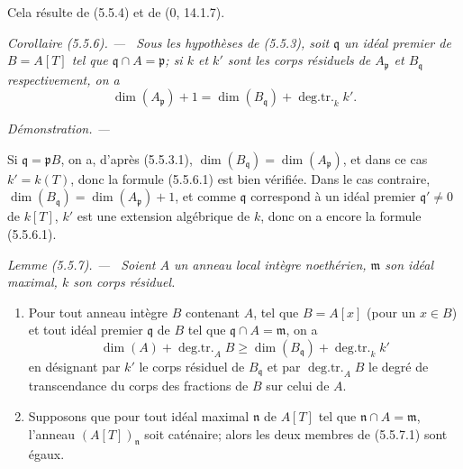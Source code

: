 \documentclass[10pt,oneside]{book}
\newcommand{\oldpage}[2][]{%
  \setcounter{footnote}{0}%
  \marginpar{\scriptsize\textbf{#1}~|~#2}\ignorespaces}
\newenvironment{corollary}[1][]{%
  \par\medskip\noindent\itshape Corollaire (#1). ---\ }{\par}
\newenvironment{lemma}[1][]{%
  \par\medskip\noindent\itshape Lemme (#1). ---\ }{\par}
\newenvironment{proof}{%
  \par\medskip\noindent\textit{Démonstration. ---\ }}{\par}
\begin{document}
Cela résulte de (5.5.4) et de (0, 14.1.7).

\begin{corollary}[5.5.6]
\label{IV.2.s5.5.6-fr}
Sous les hypothèses de (5.5.3), soit $\mathfrak q$ un idéal premier de
$B=A[T]$ tel que $\mathfrak q\cap A=\mathfrak p$; si $k$ et $k'$ sont les
corps résiduels de $A_{\mathfrak p}$ et $B_{\mathfrak q}$ respectivement,
on a
\begin{equation}
\dim(A_{\mathfrak p})+1
=\dim(B_{\mathfrak q})+\operatorname{deg.tr.}_k k'.
\tag{5.5.6.1}\label{IV.2.s5.5.6.1-fr}
\end{equation}
\end{corollary}

\begin{proof}
\oldpage[IV-2]{96}

Si $\mathfrak q=\mathfrak pB$, on a, d'après (5.5.3.1),
$\dim(B_{\mathfrak q})=\dim(A_{\mathfrak p})$, et dans ce cas $k'=k(T)$,
donc la formule (5.5.6.1) est bien vérifiée. Dans le cas contraire,
$\dim(B_{\mathfrak q})=\dim(A_{\mathfrak p})+1$, et comme $\mathfrak q$
correspond à un idéal premier $\mathfrak q'\ne0$ de $k[T]$, $k'$ est une
extension algébrique de $k$, donc on a encore la formule (5.5.6.1).
\end{proof}

\begin{lemma}[5.5.7]
\label{IV.2.s5.5.7-fr}
Soient $A$ un anneau local intègre noethérien, $\mathfrak m$ son idéal
maximal, $k$ son corps résiduel.
\begin{enumerate}
\item[(i)] Pour tout anneau intègre $B$ contenant $A$, tel que $B=A[x]$
(pour un $x\in B$) et tout idéal premier $\mathfrak q$ de $B$ tel que
$\mathfrak q\cap A=\mathfrak m$, on a
\begin{equation}
\dim(A)+\operatorname{deg.tr.}_A B
\geq\dim(B_{\mathfrak q})+\operatorname{deg.tr.}_k k'
\tag{5.5.7.1}\label{IV.2.s5.5.7.1-fr}
\end{equation}
en désignant par $k'$ le corps résiduel de $B_{\mathfrak q}$ et par
$\operatorname{deg.tr.}_A B$ le degré de transcendance du corps des
fractions de $B$ sur celui de $A$.
\item[(ii)] Supposons que pour tout idéal maximal $\mathfrak n$ de $A[T]$
tel que $\mathfrak n\cap A=\mathfrak m$, l'anneau $(A[T])_{\mathfrak n}$
soit caténaire; alors les deux membres de (5.5.7.1) sont égaux.
\end{enumerate}
\end{lemma}
\end{document}
